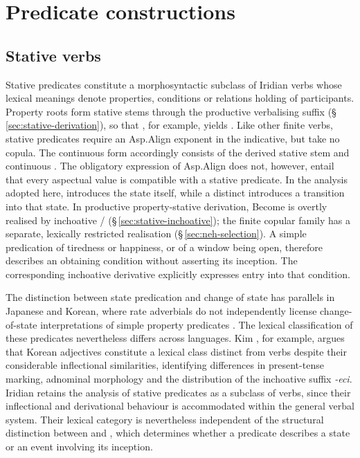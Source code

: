 \chapter{Predicate constructions}\label{ch:predicates}

\section{Stative verbs}\label{sec:stative}

Stative predicates constitute a morphosyntactic subclass of Iridian verbs
whose lexical meanings denote properties, conditions or relations holding of
participants. Property roots form stative stems through the productive
verbalising suffix  (§\,\ref{sec:stative-derivation}), so that
 , for example, yields 
. Like other finite verbs, stative predicates require an
Asp.Align exponent in the indicative, but take no copula. The continuous
form   accordingly consists of the derived
stative stem and continuous . The obligatory expression of Asp.Align
does not, however, entail that every aspectual value is compatible with a
stative predicate. In the analysis adopted here,  introduces
the state itself, while a distinct  introduces a
transition into that state. In productive property-stative derivation, Become is overtly realised
by inchoative /
(§\,\ref{sec:stative-inchoative}); the finite copular family has a
separate, lexically restricted realisation (§\,\ref{sec:neh-selection}).
A simple predication of tiredness or happiness, or of a window being open,
therefore describes an obtaining condition without asserting its inception.
The corresponding inchoative derivative explicitly expresses entry into that
condition.

The distinction between state predication and change of state has parallels
in Japanese and Korean, where rate adverbials do not independently license
change-of-state interpretations of simple property predicates
\cite[§1]{smithhopperdietzelkoontzgarboden2025}. The lexical classification
of these predicates nevertheless differs across languages. Kim
\cite{kimaeryung2024}, for example, argues that Korean adjectives constitute
a lexical class distinct from verbs despite their considerable inflectional
similarities, identifying differences in present-tense marking, adnominal
morphology and the distribution of the inchoative suffix \textit{-eci}.
Iridian retains the analysis of stative predicates as a subclass of verbs,
since their inflectional and derivational behaviour is accommodated within
the general verbal system. Their lexical category is nevertheless
independent of the structural distinction between  and
, which determines whether a predicate describes a state
or an event involving its inception.

